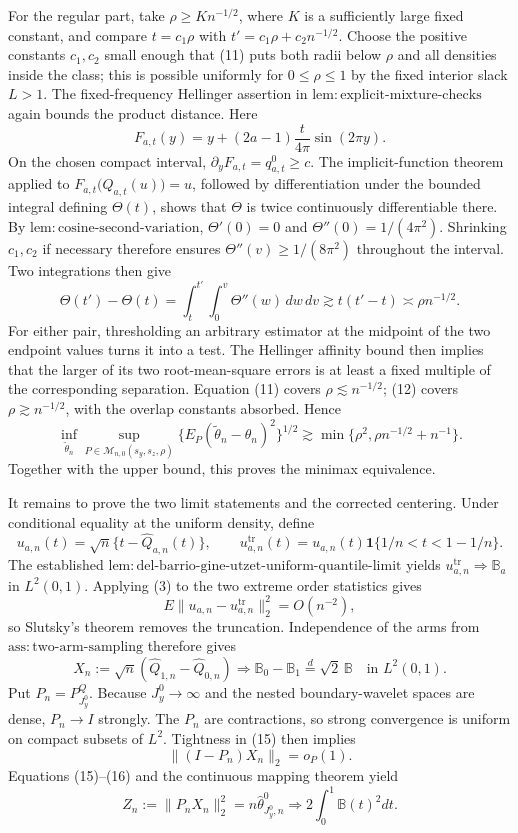 For the regular part, take \(\rho\ge K n^{-1/2}\), where \(K\) is a sufficiently large fixed constant, and compare \(t=c_1\rho\) with \(t'=c_1\rho+c_2n^{-1/2}\). Choose the positive constants \(c_1,c_2\) small enough that (11) puts both radii below \(\rho\) and all densities inside the class; this is possible uniformly for \(0\le\rho\le1\) by the fixed interior slack \(L>1\). The fixed-frequency Hellinger assertion in \(\mathrm{lem{:}explicit\text{-}mixture\text{-}checks}\) again bounds the product distance. Here
\[
F_{a,t}(y)=y+(2a-1)\frac{t}{4\pi}\sin(2\pi y).
\]
On the chosen compact interval, \(\partial_yF_{a,t}=q_{a,t}^0\ge c\). The implicit-function theorem applied to \(F_{a,t}\bigl(Q_{a,t}(u)\bigr)=u\), followed by differentiation under the bounded integral defining \(\Theta(t)\), shows that \(\Theta\) is twice continuously differentiable there. By \(\mathrm{lem{:}cosine\text{-}second\text{-}variation}\), \(\Theta'(0)=0\) and \(\Theta''(0)=1/(4\pi^2)\). Shrinking \(c_1,c_2\) if necessary therefore ensures \(\Theta''(v)\ge1/(8\pi^2)\) throughout the interval. Two integrations then give
\[
\Theta(t')-\Theta(t)
=\int_t^{t'}\int_0^v\Theta''(w)\,dw\,dv
\gtrsim t(t'-t)
\asymp\rho n^{-1/2}. \tag{12}
\]
For either pair, thresholding an arbitrary estimator at the midpoint of the two endpoint values turns it into a test. The Hellinger affinity bound then implies that the larger of its two root-mean-square errors is at least a fixed multiple of the corresponding separation. Equation (11) covers \(\rho\lesssim n^{-1/2}\); (12) covers \(\rho\gtrsim n^{-1/2}\), with the overlap constants absorbed. Hence
\[
\inf_{\widetilde\theta_n}\sup_{P\in\mathcal M_{n,0}(s_y,s_z,\rho)}
\{E_P(\widetilde\theta_n-\theta_n)^2\}^{1/2}
\gtrsim\min\{\rho^2,\rho n^{-1/2}+n^{-1}\}. \tag{13}
\]
Together with the upper bound, this proves the minimax equivalence.

It remains to prove the two limit statements and the corrected centering. Under conditional equality at the uniform density, define
\[
u_{a,n}(t)=\sqrt n\{t-\widehat Q_{a,n}(t)\},
\qquad
u_{a,n}^{\mathrm{tr}}(t)=u_{a,n}(t)\mathbf1\{1/n<t<1-1/n\}.
\]
The established \(\mathrm{lem{:}del\text{-}barrio\text{-}gine\text{-}utzet\text{-}uniform\text{-}quantile\text{-}limit}\) yields \(u_{a,n}^{\mathrm{tr}}\Rightarrow\mathbb B_a\) in \(L^2(0,1)\). Applying (3) to the two extreme order statistics gives
\[
E\|u_{a,n}-u_{a,n}^{\mathrm{tr}}\|_2^2=O(n^{-2}), \tag{14}
\]
so Slutsky's theorem removes the truncation. Independence of the arms from \(\mathrm{ass{:}two\text{-}arm\text{-}sampling}\) therefore gives
\[
X_n:=\sqrt n(\widehat Q_{1,n}-\widehat Q_{0,n})
\Rightarrow\mathbb B_0-\mathbb B_1\stackrel d=\sqrt2\,\mathbb B
\quad\text{in }L^2(0,1). \tag{15}
\]
Put \(P_n=P^Q_{J_y^0}\). Because \(J_y^0\to\infty\) and the nested boundary-wavelet spaces are dense, \(P_n\to I\) strongly. The \(P_n\) are contractions, so strong convergence is uniform on compact subsets of \(L^2\). Tightness in (15) then implies
\[
\|(I-P_n)X_n\|_2=o_P(1). \tag{16}
\]
Equations (15)--(16) and the continuous mapping theorem yield
\[
Z_n:=\|P_nX_n\|_2^2=n\widehat\theta^0_{J_y^0,n}
\Rightarrow2\int_0^1\mathbb B(t)^2dt. \tag{17}
\]

